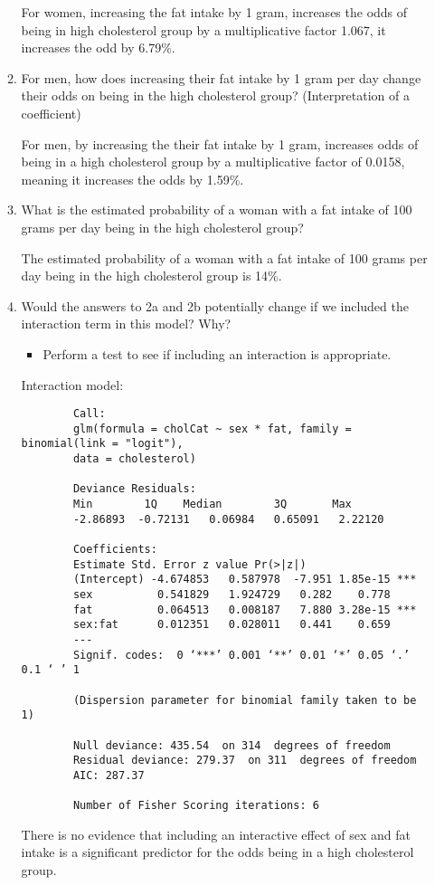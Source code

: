 \documentclass[12pt,letterpaper]{article}
\begin{document}
\begin{enumerate}
\begin{enumerate}
		For women, increasing the fat intake by 1 gram, increases the odds of being in high cholesterol group by a multiplicative factor 1.067, it increases the odd by 6.79\%. 
			\item
			For men, how does increasing their fat intake by 1 gram per day change their odds on being in the high cholesterol group? (Interpretation of a coefficient)
			
	For men, by increasing the their fat intake by 1 gram, increases odds of being in a high cholesterol group by a multiplicative factor of 0.0158, meaning it increases the odds by 1.59\%.
			\item
			What is the estimated probability of a woman with a fat intake of 100 grams per day being in the high cholesterol group? 
			
			The estimated probability of a woman with a fat intake of 100 grams per day being in the high cholesterol group is 14\%. 
			\item	
			Would the answers to 2a and 2b potentially change if we included the interaction term in this model? Why? 
		
			\begin{itemize}
				\item Perform a test to see if including an interaction is appropriate.
			\end{itemize}
	
		Interaction model:
		\begin{verbatim}
		Call:
		glm(formula = cholCat ~ sex * fat, family = binomial(link = "logit"), 
		data = cholesterol)
		
		Deviance Residuals: 
		Min        1Q    Median        3Q       Max  
		-2.86893  -0.72131   0.06984   0.65091   2.22120  
		
		Coefficients:
		Estimate Std. Error z value Pr(>|z|)    
		(Intercept) -4.674853   0.587978  -7.951 1.85e-15 ***
		sex          0.541829   1.924729   0.282    0.778    
		fat          0.064513   0.008187   7.880 3.28e-15 ***
		sex:fat      0.012351   0.028011   0.441    0.659    
		---
		Signif. codes:  0 ‘***’ 0.001 ‘**’ 0.01 ‘*’ 0.05 ‘.’ 0.1 ‘ ’ 1
		
		(Dispersion parameter for binomial family taken to be 1)
		
		Null deviance: 435.54  on 314  degrees of freedom
		Residual deviance: 279.37  on 311  degrees of freedom
		AIC: 287.37
		
		Number of Fisher Scoring iterations: 6
		\end{verbatim}
		
		There is no evidence that including an interactive effect of sex and fat intake is a significant predictor for the odds being in a high cholesterol group. 
		
		\end{enumerate}
	\end{enumerate}
	\newpage
	
\end{document}
